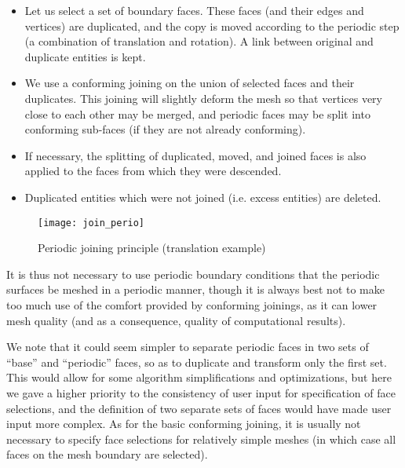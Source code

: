 \begin{itemize}

\item Let us select a set of boundary faces. These faces (and their
      edges and vertices) are duplicated, and the copy is moved
      according to the periodic step (a combination of translation
      and rotation). A link between original and duplicate
      entities is kept.

\item We use a conforming joining on the union of
      selected faces and their duplicates.
      This joining will slightly deform the mesh so that vertices
      very close to each other may be merged, and periodic
      faces may be split into conforming sub-faces (if they are
      not already conforming).

\item If necessary, the splitting of duplicated, moved, and joined
      faces is also applied to the faces from which they were
      descended.

\item Duplicated entities which were not joined (i.e. excess entities)
      are deleted.

\end{itemize}

\begin{figure}[!h]
\centerline{
\texttt{[image: join\_perio]}}
\caption{Periodic joining principle (translation example)}
\label{fig:algo.rc_perio}
\end{figure}

It is thus not necessary to use periodic boundary conditions
that the periodic surfaces be meshed in a periodic manner,
though it is always best not to make too much use of the
comfort provided by conforming joinings, as it can lower
mesh quality (and as a consequence, quality of computational
results).

We note that it could seem simpler to separate periodic faces
in two sets of ``base'' and ``periodic'' faces, so as
to duplicate and transform only the first set. This would
allow for some algorithm simplifications and optimizations,
but here we gave a higher priority to the consistency
of user input for specification of face selections, and
the definition of two separate sets of faces would have
made user input more complex. As for the basic
conforming joining, it is usually not necessary to specify
face selections for relatively simple meshes (in which case
all faces on the mesh boundary are selected).

